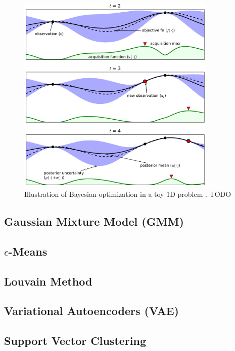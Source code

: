 \begin{figure}
\centering
\includegraphics[width=0.85\textwidth]{figures/ml/toyGPtext3.pdf}
\caption{
Illustration of Bayesian optimization in a toy 1D problem \cite{Brochu2010}.
TODO
}
\label{fig:BO_ex}
\end{figure}


\subsection{Gaussian Mixture Model (GMM)}
\label{additional:unsupervised:GMM}

\subsection{\texorpdfstring{$\epsilon$}{epsilon}-Means}
\label{additional:unsupervised:epsilonMean}

\subsection{Louvain Method}
\label{additional:unsupervised:louvain}

\subsection{Variational Autoencoders (VAE)}
\label{additional:unsupervised:VAE}

\subsection{Support Vector Clustering}
\label{additional:unsupervised:SVC}

